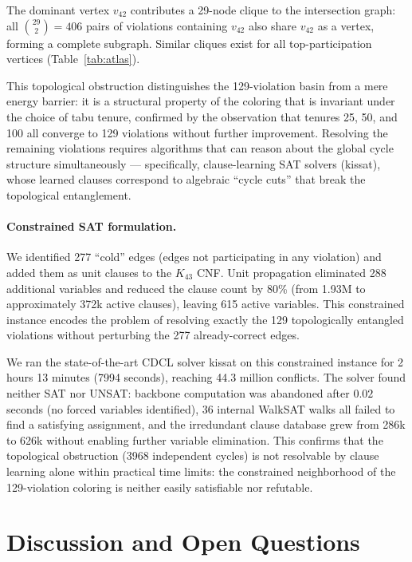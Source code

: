 \documentclass[11pt]{article}
\begin{document}
The dominant vertex $v_{42}$ contributes a 29-node clique to the intersection graph:
all $\binom{29}{2} = 406$ pairs of violations containing $v_{42}$ also share $v_{42}$
as a vertex, forming a complete subgraph.
Similar cliques exist for all top-participation vertices (Table~\ref{tab:atlas}).

This topological obstruction distinguishes the 129-violation basin from a
mere energy barrier: it is a structural property of the coloring that is
invariant under the choice of tabu tenure, confirmed by the observation that
tenures 25, 50, and 100 all converge to 129 violations without further improvement.
Resolving the remaining violations requires algorithms that can reason about
the global cycle structure simultaneously ---
specifically, clause-learning SAT solvers (kissat), whose learned clauses correspond
to algebraic ``cycle cuts'' that break the topological entanglement.

\paragraph{Constrained SAT formulation.}
We identified 277 ``cold'' edges (edges not participating in any violation)
and added them as unit clauses to the $K_{43}$ CNF.
Unit propagation eliminated 288 additional variables and reduced the clause count
by 80\% (from 1.93M to approximately 372k active clauses),
leaving 615 active variables.
This constrained instance encodes the problem of resolving exactly the 129 topologically
entangled violations without perturbing the 277 already-correct edges.

We ran the state-of-the-art CDCL solver kissat on this constrained instance for
2 hours 13 minutes (7994 seconds), reaching 44.3 million conflicts.
The solver found neither SAT nor UNSAT: backbone computation was abandoned after
$0.02$ seconds (no forced variables identified), 36 internal WalkSAT walks all
failed to find a satisfying assignment, and the irredundant clause database grew
from 286k to 626k without enabling further variable elimination.
This confirms that the topological obstruction (3968 independent cycles) is not
resolvable by clause learning alone within practical time limits:
the constrained neighborhood of the 129-violation coloring is neither easily
satisfiable nor refutable.

\section{Discussion and Open Questions}
\end{document}
